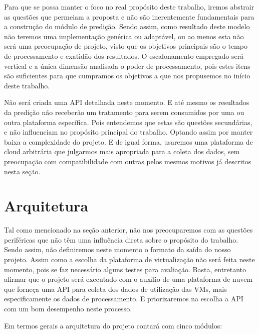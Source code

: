 \documentclass[twoside,english,brazilian]{UNISINOSmonografia}
\begin{document}
Para que se possa manter o foco no real propósito deste trabalho, iremos abstrair as questões que permeiam a proposta e não são inerentemente fundamentais para a construção do módulo de predição. Sendo assim, como resultado deste modelo não teremos uma implementação genérica ou adaptável, ou ao menos esta não será uma preocupação de projeto, visto que os objetivos principais são o tempo de processamento e exatidão dos resultados. O escalonamento empregado será vertical e a única dimensão analisada o poder de processamento, pois estes itens são suficientes para que cumpramos os objetivos a que nos propusemos no início deste trabalho. 

Não será criada uma API detalhada neste momento. E até mesmo os resultados da predição não receberão um tratamento para serem consumidos por uma ou outra plataforma específica. Pois entendemos que estas são questões secundárias, e não influenciam no propósito principal do trabalho. Optando assim por manter baixa a complexidade do projeto. E de igual forma, usaremos uma plataforma de cloud arbitrária que julgarmos mais apropriada para a coleta dos dados, sem preocupação com compatibilidade com outras pelos mesmos motivos já descritos nesta seção.

\section{Arquitetura}

Tal como mencionado na seção anterior, não nos preocuparemos com as questões periféricas que não têm uma influência direta sobre o propósito do trabalho. Sendo assim, não definiremos neste momento o formato da saída do nosso projeto. Assim como a escolha da plataforma de virtualização não será feita neste momento, pois se faz necessário alguns testes para avaliação. Basta, entretanto afirmar que o projeto será executado com o auxílio de uma plataforma de nuvem que forneça uma API para coleta dos dados de utilização das VMs, mais especificamente os dados de processamento. E priorizaremos na escolha a API com um bom desempenho neste processo.

Em termos gerais a arquitetura do projeto contará com cinco módulos:
\end{document}
